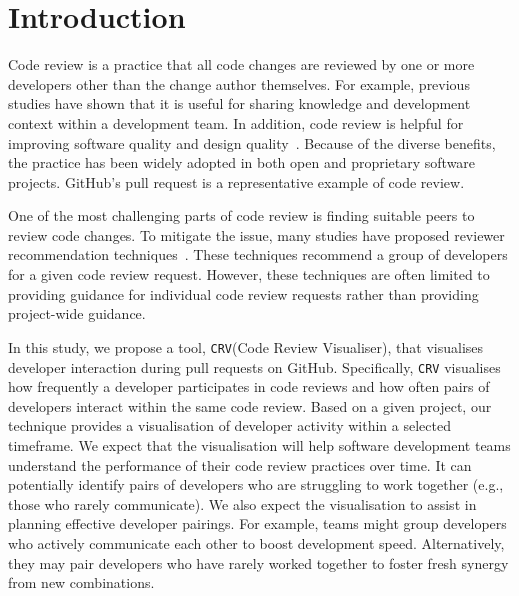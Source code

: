 \documentclass[sigconf]{acmart}
\newcommand{\service}{{\tt CRV}\xspace}
\begin{document}



\maketitle

\section{Introduction}
\label{sec:introduction}



Code review is a practice that all code changes are reviewed by one or more developers other than the change author themselves.
For example, previous studies have shown that it is useful for sharing knowledge and development context within a development team.
In addition, code review is helpful for improving software quality and design quality~\cite{McIntosh14, Morales15}.
Because of the diverse benefits, the practice has been widely adopted in both open and proprietary software projects.
GitHub's pull request is a representative example of code review.

One of the most challenging parts of code review is finding suitable peers to review code changes.
To mitigate the issue, many studies have proposed reviewer recommendation techniques~\cite{Thongtanunam15, Yu16}.
These techniques recommend a group of developers for a given code review request.
However, these techniques are often limited to providing guidance for individual code review requests rather than providing project-wide guidance.

In this study, we propose a tool, \service (Code Review Visualiser), that visualises developer interaction during pull requests on GitHub.
Specifically, \service visualises how frequently a developer participates in code reviews and how often pairs of developers interact within the same code review.
Based on a given project, our technique provides a visualisation of developer activity within a selected timeframe.
We expect that the visualisation will help software development teams understand the performance of their code review practices over time.
It can potentially identify pairs of developers who are struggling to work together (e.g., those who rarely communicate).
We also expect the visualisation to assist in planning effective developer pairings.
For example, teams might group developers who actively communicate each other to boost development speed.
Alternatively, they may pair developers who have rarely worked together to foster fresh synergy from new combinations.
\end{document}
